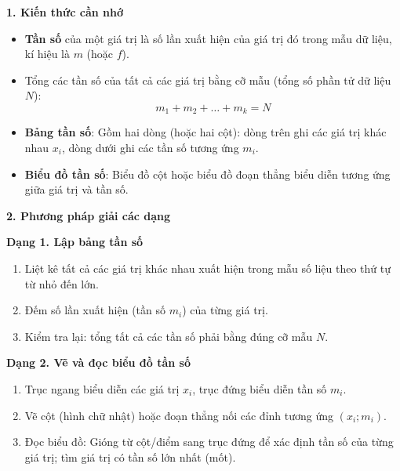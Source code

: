 \textbf{1. Kiến thức cần nhớ}
\begin{itemize}
\item \textbf{Tần số} của một giá trị là số lần xuất hiện của giá trị đó trong mẫu dữ liệu, kí hiệu là $m$ (hoặc $f$).
\item Tổng các tần số của tất cả các giá trị bằng cỡ mẫu (tổng số phần tử dữ liệu $N$):
$$\boxed{m_1 + m_2 + \dots + m_k = N}$$
\item \textbf{Bảng tần số}: Gồm hai dòng (hoặc hai cột): dòng trên ghi các giá trị khác nhau $x_i$, dòng dưới ghi các tần số tương ứng $m_i$.
\item \textbf{Biểu đồ tần số}: Biểu đồ cột hoặc biểu đồ đoạn thẳng biểu diễn tương ứng giữa giá trị và tần số.
\end{itemize}

\textbf{2. Phương pháp giải các dạng}

\textbf{Dạng 1. Lập bảng tần số}
\begin{enumerate}
\item Liệt kê tất cả các giá trị khác nhau xuất hiện trong mẫu số liệu theo thứ tự từ nhỏ đến lớn.
\item Đếm số lần xuất hiện (tần số $m_i$) của từng giá trị.
\item Kiểm tra lại: tổng tất cả các tần số phải bằng đúng cỡ mẫu $N$.
\end{enumerate}

\textbf{Dạng 2. Vẽ và đọc biểu đồ tần số}
\begin{enumerate}
\item Trục ngang biểu diễn các giá trị $x_i$, trục đứng biểu diễn tần số $m_i$.
\item Vẽ cột (hình chữ nhật) hoặc đoạn thẳng nối các đỉnh tương ứng $(x_i; m_i)$.
\item Đọc biểu đồ: Gióng từ cột/điểm sang trục đứng để xác định tần số của từng giá trị; tìm giá trị có tần số lớn nhất (mốt).
\end{enumerate}
